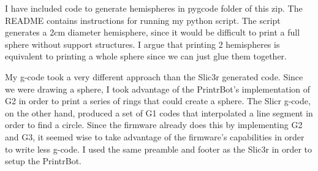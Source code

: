 \documentclass[letter]{article}
\begin{document}
I have included code to generate hemispheres in pygcode folder of this zip. The README contains instructions for running my python script. The script generates a 2cm diameter hemisphere, since it would be difficult to print a full sphere without support structures. I argue that printing 2 hemispheres is equivalent to printing a whole sphere since we can just glue them together. 

My g-code took a very different approach than the Slic3r generated code. Since we were drawing a sphere, I took advantage of the PrintrBot's implementation of G2 in order to print a series of rings that could create a sphere. The Slicr g-code, on the other hand, produced a set of G1 codes that interpolated a line segment in order to find a circle. Since the firmware already does this by implementing G2 and G3, it seemed wise to take advantage of the firmware's capabilities in order to write less g-code. I used the same preamble and footer as the Slic3r in order to setup the PrintrBot. 
\end{document}
